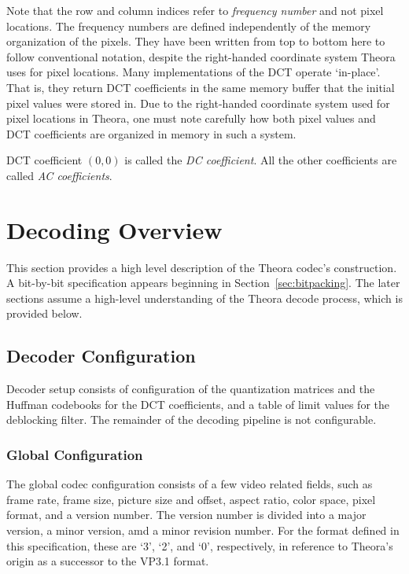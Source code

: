 \documentclass[11pt,letterpaper]{book}
\newcommand{\term}[1]{{\em #1}}
\numberwithin{equation}{chapter}
\numberwithin{figure}{chapter}
\numberwithin{table}{chapter}
\begin{document}
Note that the row and column indices refer to {\em frequency number} and not
 pixel locations.
The frequency numbers are defined independently of the memory organization of
 the pixels.
They have been written from top to bottom here to follow conventional notation,
 despite the right-handed coordinate system Theora uses for pixel locations.
Many implementations of the DCT operate `in-place'.
That is, they return DCT coefficients in the same memory buffer that the
 initial pixel values were stored in.
Due to the right-handed coordinate system used for pixel locations in Theora,
 one must note carefully how both pixel values and DCT coefficients are
 organized in memory in such a system.

DCT coefficient $(0,0)$ is called the \term{DC coefficient}.
All the other coefficients are called \term{AC coefficients}.


\chapter{Decoding Overview}

This section provides a high level description of the Theora codec's
 construction.
A bit-by-bit specification appears beginning in Section~\ref{sec:bitpacking}.
The later sections assume a high-level understanding of the Theora decode
 process, which is provided below.

\section{Decoder Configuration}

Decoder setup consists of configuration of the quantization matrices and the
 Huffman codebooks for the DCT coefficients, and a table of limit values for
 the deblocking filter.
The remainder of the decoding pipeline is not configurable.

\subsection{Global Configuration}

The global codec configuration consists of a few video related fields, such as
 frame rate, frame size, picture size and offset, aspect ratio, color space,
 pixel format, and a version number.
The version number is divided into a major version, a minor version, amd a
 minor revision number.
For the format defined in this specification, these are `3', `2', and
 `0', respectively, in reference to Theora's origin as a successor to the VP3.1
 format.
\end{document}
